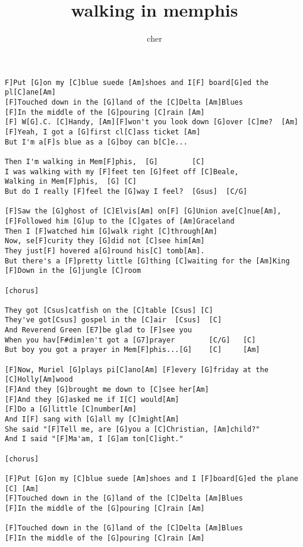 \author{cher}
\title{walking in memphis}
\maketitle
\begin{verbatim}
F]Put [G]on my [C]blue suede [Am]shoes and I[F] board[G]ed the pl[C]ane[Am]
[F]Touched down in the [G]land of the [C]Delta [Am]Blues
[F]In the middle of the [G]pouring [C]rain [Am]
[F] W[G].C. [C]Handy, [Am][F]won't you look down [G]over [C]me?  [Am]
[F]Yeah, I got a [G]first cl[C]ass ticket [Am]
But I'm a[F]s blue as a [G]boy can b[C]e...

Then I'm walking in Mem[F]phis,  [G]        [C]
I was walking with my [F]feet ten [G]feet off [C]Beale,
Walking in Mem[F]phis,  [G] [C]
But do I really [F]feel the [G]way I feel?  [Gsus]  [C/G]

[F]Saw the [G]ghost of [C]Elvis[Am] on[F] [G]Union ave[C]nue[Am],
[F]Followed him [G]up to the [C]gates of [Am]Graceland
Then I [F]watched him [G]walk right [C]through[Am]
Now, se[F]curity they [G]did not [C]see him[Am]
They just[F] hovered a[G]round his[C] tomb[Am].
But there's a [F]pretty little [G]thing [C]waiting for the [Am]King
[F]Down in the [G]jungle [C]room

[chorus]

They got [Csus]catfish on the [C]table [Csus] [C]
They've got[Csus] gospel in the [C]air  [Csus]  [C]
And Reverend Green [E7]be glad to [F]see you
When you hav[F#dim]en't got a [G7]prayer        [C/G]   [C]
But boy you got a prayer in Mem[F]phis...[G]    [C]     [Am]

[F]Now, Muriel [G]plays pi[C]ano[Am] [F]every [G]friday at the [C]Holly[Am]wood
[F]And they [G]brought me down to [C]see her[Am]
[F]And they [G]asked me if I[C] would[Am]
[F]Do a [G]little [C]number[Am]
And I[F] sang with [G]all my [C]might[Am]
She said "[F]Tell me, are [G]you a [C]Christian, [Am]child?"
And I said "[F]Ma'am, I [G]am ton[C]ight."

[chorus]

[F]Put [G]on my [C]blue suede [Am]shoes and I [F]board[G]ed the plane [C] [Am]
[F]Touched down in the [G]land of the [C]Delta [Am]Blues
[F]In the middle of the [G]pouring [C]rain [Am]

[F]Touched down in the [G]land of the [C]Delta [Am]Blues
[F]In the middle of the [G]pouring [C]rain [Am]
\end{verbatim}